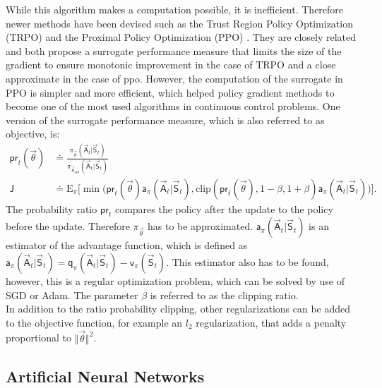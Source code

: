 While this algorithm makes a computation possible, it is inefficient. Therefore newer methods have been devised such as the Trust Region Policy Optimization (TRPO) \cite{schulman_trust_2015} and the Proximal Policy Optimization (PPO) \cite{schulman_proximal_2017}. They are closely related and both propose a surrogate performance measure that limits the size of the gradient to ensure monotonic improvement in the case of TRPO and a close approximate in the case of ppo. However, the computation of the surrogate in PPO is simpler and more efficient, which helped policy gradient methods to become one of the most used algorithms in continuous control problems. One version of the surrogate performance measure, which is also referred to as objective, is:
\begin{align}
\mathsf{pr}_t(\vec{\theta}) &\doteq \frac{\pi_{\vec{\theta}}(\vec{\mathsf{A}}_t \vert \vec{\mathsf{S}}_t)}{\pi_{\vec{\theta}_{old}} (\vec{\mathsf{A}}_t \vert \vec{\mathsf{S}}_t)} \\
\mathsf{J} &\doteq \mathrm{E}_\pi  \bigg[\min \Big(\mathsf{pr}_t(\vec{\theta}) \mathsf{a}_\pi(\vec{\mathsf{A}}_t \vert \vec{\mathsf{S}}_t), \mathrm{clip}(\mathsf{pr}_t(\vec{\theta}), 1- \beta, 1+\beta) \mathsf{a}_\pi(\vec{\mathsf{A}}_t \vert \vec{\mathsf{S}}_t) \Big) \bigg]. \label{eq:object_ppo}
\end{align}
The probability ratio $\mathsf{pr}_t$ compares the policy after the update to the policy before the update. Therefore $\pi_{\vec{\theta}}$ has to be approximated. $\mathsf{a}_\pi(\vec{\mathsf{A}}_t \vert \vec{\mathsf{S}}_t)$ is an estimator of the advantage function, which is defined as $\mathsf{a}_\pi(\vec{\mathsf{A}}_t \vert \vec{\mathsf{S}}_t) = \mathsf{q}_\pi(\vec{\mathsf{A}}_t \vert \vec{\mathsf{S}}_t) - \mathsf{v}_\pi(\vec{\mathsf{S}}_t)$. This estimator also has to be found, however, this is a regular optimization problem, which can be solved by use of SGD or Adam. The parameter $\beta$ is referred to as the clipping ratio. \cite{schulman_proximal_2017} \\
In addition to the ratio probability clipping, other regularizations can be added to the objective function, for example an $l_2$ regularization, that adds a penalty proportional to $\Vert\vec{\theta}\Vert^2$.
\subsection{Artificial Neural Networks}
